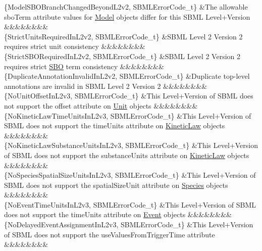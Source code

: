 \begin{DoxyParagraph}{}
\begin{longtabu}
\{Model\+S\+B\+O\+Branch\+Changed\+Beyond\+L2v2, S\+B\+M\+L\+Error\+Code\+\_\+t\} &The allowable \textquotesingle{}sbo\+Term\textquotesingle{} attribute values for \hyperlink{class_model}{Model} objects differ for this S\+B\+ML Level+\+Version &&&&&&&&\\
\{Strict\+Units\+Required\+In\+L2v2, S\+B\+M\+L\+Error\+Code\+\_\+t\} &S\+B\+ML Level 2 Version 2 requires strict unit consistency &&&&&&&&\\
\{Strict\+S\+B\+O\+Required\+In\+L2v2, S\+B\+M\+L\+Error\+Code\+\_\+t\} &S\+B\+ML Level 2 Version 2 requires strict \hyperlink{class_s_b_o}{S\+BO} term consistency &&&&&&&&\\
\{Duplicate\+Annotation\+Invalid\+In\+L2v2, S\+B\+M\+L\+Error\+Code\+\_\+t\} &Duplicate top-\/level annotations are invalid in S\+B\+ML Level 2 Version 2 &&&&&&&&\\
\{No\+Unit\+Offset\+In\+L2v3, S\+B\+M\+L\+Error\+Code\+\_\+t\} &This Level+\+Version of S\+B\+ML does not support the \textquotesingle{}offset\textquotesingle{} attribute on \hyperlink{class_unit}{Unit} objects &&&&&&&&\\
\{No\+Kinetic\+Law\+Time\+Units\+In\+L2v3, S\+B\+M\+L\+Error\+Code\+\_\+t\} &This Level+\+Version of S\+B\+ML does not support the \textquotesingle{}time\+Units\textquotesingle{} attribute on \hyperlink{class_kinetic_law}{Kinetic\+Law} objects &&&&&&&&\\
\{No\+Kinetic\+Law\+Substance\+Units\+In\+L2v3, S\+B\+M\+L\+Error\+Code\+\_\+t\} &This Level+\+Version of S\+B\+ML does not support the \textquotesingle{}substance\+Units\textquotesingle{} attribute on \hyperlink{class_kinetic_law}{Kinetic\+Law} objects &&&&&&&&\\
\{No\+Species\+Spatial\+Size\+Units\+In\+L2v3, S\+B\+M\+L\+Error\+Code\+\_\+t\} &This Level+\+Version of S\+B\+ML does not support the \textquotesingle{}spatial\+Size\+Unit\textquotesingle{} attribute on \hyperlink{class_species}{Species} objects &&&&&&&&\\
\{No\+Event\+Time\+Units\+In\+L2v3, S\+B\+M\+L\+Error\+Code\+\_\+t\} &This Level+\+Version of S\+B\+ML does not support the \textquotesingle{}time\+Units\textquotesingle{} attribute on \hyperlink{class_event}{Event} objects &&&&&&&&\\
\{No\+Delayed\+Event\+Assignment\+In\+L2v3, S\+B\+M\+L\+Error\+Code\+\_\+t\} &This Level+\+Version of S\+B\+ML does not support the \textquotesingle{}use\+Values\+From\+Trigger\+Time\textquotesingle{} attribute &&&&&&&&\\

\end{longtabu}
\end{DoxyParagraph}
